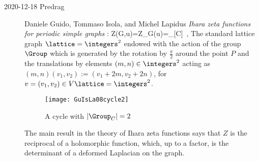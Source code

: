 \begin{description}
\item[2020-12-18 Predrag]
Daniele Guido, Tommaso Isola, and Michel Lapidus
{\em Ihara zeta functions for periodic simple graphs}
:
\beq
  Z(G,u)=Z_G(u)=\prod_{[C]}
\,,
The standard lattice graph $\lattice=\integers^{2}$ endowed with the action of the
group $\Group$ which is generated by the rotation by $\frac{\pi}{2}$
around the point $P$ and the translations by elements $(m,n)\in\integers^{2}$
acting as $(m,n)(v_{1},v_{2}):= (v_{1}+2m,v_{2}+2n)$, for
$v=(v_{1},v_{2})\in V\lattice=\integers^{2}$.
\\ 

\begin{figure}
	 \centering
	 \texttt{[image: GuIsLa08cycle2]}
	 \caption{A cycle with $|\Group_{C}|=2$}
	 \label{fig:GuIsLa08cycle2}
\end{figure}

The main result in the theory of Ihara zeta functions 
says that $Z$ is the reciprocal of a holomorphic function, which, up to a
factor, is the determinant of a deformed Laplacian on the graph.



\end{description}
